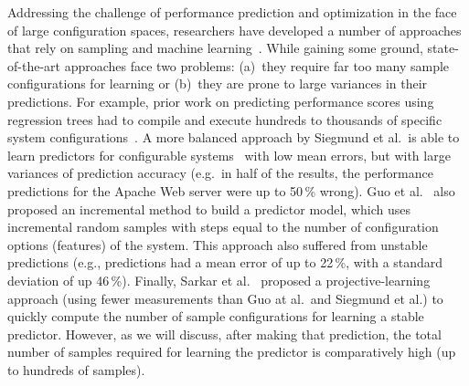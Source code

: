 \documentclass[smallextended]{svjour3}       %
\begin{document}
Addressing the challenge of performance prediction and optimization in the face of large configuration spaces, researchers have developed a number of approaches that rely on sampling and machine learning~\cite{siegmund2012predicting,guo2013variability,sarkar2015cost}.
While gaining some ground, state-of-the-art approaches face two problems: 
(a)~they require far too many sample configurations for learning or (b)~they are prone to large variances in their predictions. For example, prior work on predicting performance scores using regression trees had to compile and execute hundreds to thousands of specific system configurations~\cite{guo2013variability}. 
A more balanced approach by Siegmund et al.\ is able to learn predictors for  configurable systems~\cite{siegmund2012predicting} with low mean errors, but with large variances of prediction accuracy  (e.g.\ in half of the results, the performance predictions for the Apache Web server were up to 50\,\% wrong). 
Guo et al.~\cite{guo2013variability} also proposed an incremental method to build a predictor model, which uses incremental random samples with steps equal to the number of configuration options (features) of the system. This approach also
suffered from  unstable predictions (e.g., predictions had a mean error of up to 22\,\%, with a standard deviation of up 46\,\%). Finally, Sarkar et al.~\cite{sarkar2015cost} proposed a proj\-ective-learning approach (using fewer measurements than Guo at al.\ and Siegmund et al.) to quickly compute  the number of sample configurations for learning a stable predictor. However, as we will discuss, after making that prediction, the total number of samples required for learning the predictor is comparatively high (up to hundreds of samples).
\end{document}
